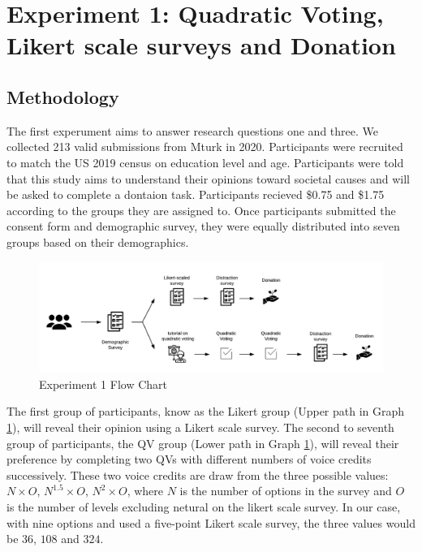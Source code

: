 \section{Experiment 1: Quadratic Voting, Likert scale surveys and Donation}
\subsection{Methodology} \label{method-1}
The first experument aims to 
answer research questions one and three.
We collected 213 valid submissions %
from Mturk in 2020.
Participants were recruited 
to match the US 2019 census 
on education level and age.
Participants were told that this study
aims to understand their opinions
toward societal causes and 
will be asked to complete a dontaion task.
Participants recieved \$0.75 and \$1.75
according to the groups they are assigned to.
Once participants submitted 
the consent form and demographic survey,
they were equally distributed into seven groups
based on their demographics.

\begin{figure}[htpb]
    \centering
    \includegraphics[width=\textwidth, keepaspectratio=true]{content/image/exp1_flow.png}
    \caption{
        Experiment 1 Flow Chart
    }
    \label{fig:exp1_image_flow}
\end{figure}

The first group of participants,
know as the Likert group (Upper path in Graph \ref{fig:exp1_image_flow}),
will reveal their opinion
using a Likert scale survey.
The second to seventh group of participants,
the QV group (Lower path in Graph \ref{fig:exp1_image_flow}),
will reveal their preference
by completing two QVs 
with different numbers of voice credits
successively. 
These two voice credits are draw from 
the three possible values: 
$N \times O$, $N^1.5 \times O$, $N^2 \times O$,
where $N$ is the number of options
in the survey and 
$O$ is the number of levels excluding netural
on the likert scale survey. %
In our case, with nine options 
and used a five-point Likert scale survey,
the three values would be 
$36$, $108$ and $324$.

